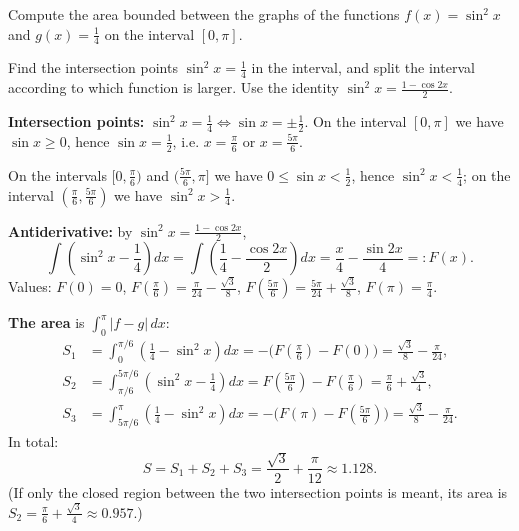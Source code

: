 
\begin{question}
Compute the area bounded between the graphs of the functions $f(x)=\sin^2x$ and $g(x)=\frac14$ on the interval $[0,\pi]$.
\end{question}

\begin{hint}
Find the intersection points $\sin^2x=\frac14$ in the interval, and split the interval according to which function is larger. Use the identity $\sin^2x=\frac{1-\cos 2x}{2}$.
\end{hint}

\begin{solution}
\textbf{Intersection points:} $\sin^2x=\frac14\iff\sin x=\pm\frac12$. On the interval $[0,\pi]$ we have $\sin x\ge 0$, hence $\sin x=\frac12$, i.e. $x=\frac{\pi}{6}$ or $x=\frac{5\pi}{6}$.

On the intervals $[0,\frac{\pi}{6})$ and $(\frac{5\pi}{6},\pi]$ we have $0\le\sin x<\frac12$, hence $\sin^2x<\frac14$; on the interval $(\frac{\pi}{6},\frac{5\pi}{6})$ we have $\sin^2x>\frac14$.

\textbf{Antiderivative:} by $\sin^2x=\frac{1-\cos2x}{2}$,
\[ \int\left(\sin^2x-\frac14\right)dx=\int\left(\frac14-\frac{\cos 2x}{2}\right)dx=\frac{x}{4}-\frac{\sin 2x}{4}=:F(x). \]
Values: $F(0)=0$, $F(\frac{\pi}{6})=\frac{\pi}{24}-\frac{\sqrt3}{8}$, $F(\frac{5\pi}{6})=\frac{5\pi}{24}+\frac{\sqrt3}{8}$, $F(\pi)=\frac{\pi}{4}$.

\textbf{The area} is $\int_0^\pi|f-g|\,dx$:
\begin{align*}
S_1&=\int_0^{\pi/6}\left(\tfrac14-\sin^2x\right)dx=-\big(F(\tfrac{\pi}{6})-F(0)\big)=\frac{\sqrt3}{8}-\frac{\pi}{24},\\
S_2&=\int_{\pi/6}^{5\pi/6}\left(\sin^2x-\tfrac14\right)dx=F(\tfrac{5\pi}{6})-F(\tfrac{\pi}{6})=\frac{\pi}{6}+\frac{\sqrt3}{4},\\
S_3&=\int_{5\pi/6}^{\pi}\left(\tfrac14-\sin^2x\right)dx=-\big(F(\pi)-F(\tfrac{5\pi}{6})\big)=\frac{\sqrt3}{8}-\frac{\pi}{24}.
\end{align*}
In total:
\[ S=S_1+S_2+S_3=\frac{\sqrt3}{2}+\frac{\pi}{12}\approx 1.128. \]
(If only the closed region between the two intersection points is meant, its area is $S_2=\frac{\pi}{6}+\frac{\sqrt3}{4}\approx 0.957$.)
\end{solution}
